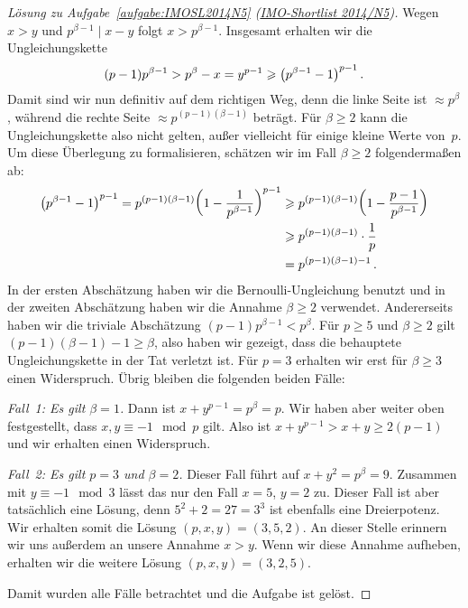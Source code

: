 \begin{proof}[Lösung zu Aufgabe~\ref{aufgabe:IMOSL2014N5} \textmd{(\href{https://artofproblemsolving.com/community/c107000_2014_imo_shortlist}{IMO-Shortlist 2014/N5})}]
	Wegen $x>y$ und $p^{\beta-1}\mid x-y$ folgt $x>p^{\beta-1}$. Insgesamt erhalten wir die Ungleichungskette
	\begin{equation*}
		(p-1)p^{\beta-1}>p^\beta-x =y^{p-1}\geqslant \parens*{p^{\beta-1}-1}^{p-1}\,.
	\end{equation*}
	Damit sind wir nun definitiv auf dem richtigen Weg, denn die linke Seite ist $\approx p^\beta$, während die rechte Seite $\approx p^{(p-1)(\beta-1)}$ beträgt. Für $\beta\geqslant 2$ kann die Ungleichungskette also nicht gelten, außer vielleicht für einige kleine Werte von~$p$. Um diese Überlegung zu formalisieren, schätzen wir im Fall $\beta\geqslant 2$ folgendermaßen ab:
	\begin{align*}
		\parens*{p^{\beta-1}-1}^{p-1}=p^{(p-1)(\beta-1)}\parens*{1-\frac{1}{p^{\beta-1}}}^{p-1}&\geqslant p^{(p-1)(\beta-1)}\parens*{1-\frac{p-1}{p^{\beta-1}}}\\
		&\geqslant p^{(p-1)(\beta-1)}\cdot \frac 1p\\
		&=p^{(p-1)(\beta-1)-1}\,.
	\end{align*}
	In der ersten Abschätzung haben wir die Bernoulli-Ungleichung benutzt und in der zweiten Abschätzung haben wir die Annahme $\beta\geqslant 2$ verwendet. Andererseits haben wir die triviale Abschätzung $(p-1)p^{\beta-1}<p^\beta$. Für $p\geqslant 5$ und $\beta\geqslant 2$ gilt $(p-1)(\beta-1)-1\geqslant \beta$, also haben wir gezeigt, dass die behauptete Ungleichungskette in der Tat verletzt ist. Für $p=3$ erhalten wir erst für $\beta\geqslant 3$ einen Widerspruch. Übrig bleiben die folgenden beiden Fälle:
	
	\emph{Fall~1: Es gilt $\beta=1$.} Dann ist $x+y^{p-1}=p^\beta=p$. Wir haben aber weiter oben festgestellt, dass $x,y\equiv -1\mod p$ gilt. Also ist $x+y^{p-1}>x+y\geqslant 2(p-1)$ und wir erhalten einen Widerspruch.
	
	\emph{Fall~2: Es gilt $p=3$ und $\beta=2$.} Dieser Fall führt auf $x+y^2=p^\beta=9$. Zusammen mit $y\equiv -1\mod 3$ lässt das nur den Fall $x=5$, $y=2$ zu. Dieser Fall ist aber tatsächlich eine Lösung, denn $5^2+2=27=3^3$ ist ebenfalls eine Dreierpotenz. Wir erhalten somit die Lösung $(p,x,y)=(3,5,2)$. An dieser Stelle erinnern wir uns außerdem an unsere Annahme $x>y$. Wenn wir diese Annahme aufheben, erhalten wir die weitere Lösung $(p,x,y)=(3,2,5)$.
	
	Damit wurden alle Fälle betrachtet und die Aufgabe ist gelöst.
\end{proof}